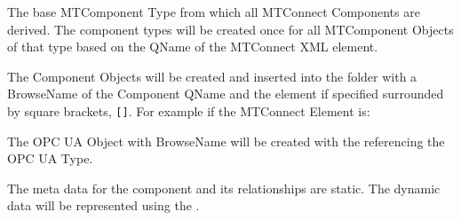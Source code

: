 \FloatBarrier


The base \gls{MTComponent} Type from which all MTConnect Components are derived.
The component types will be created once for all \gls{MTComponent} \glspl{Object}
of that type based on the \gls{QName} of the MTConnect XML element. 

The Component Objects will be created and inserted into the  
folder with a \gls{BrowseName} of the Component \gls{QName} and the  element if specified surrounded 
by square brackets, \texttt{[]}. For example if the MTConnect Element is:


The OPC UA Object with \gls{BrowseName}  will be created with the 
referencing the  OPC UA \gls{Type}. 

The meta data for the component and its relationships are static. The dynamic data will be 
represented using the \cite{UAPart8}.

